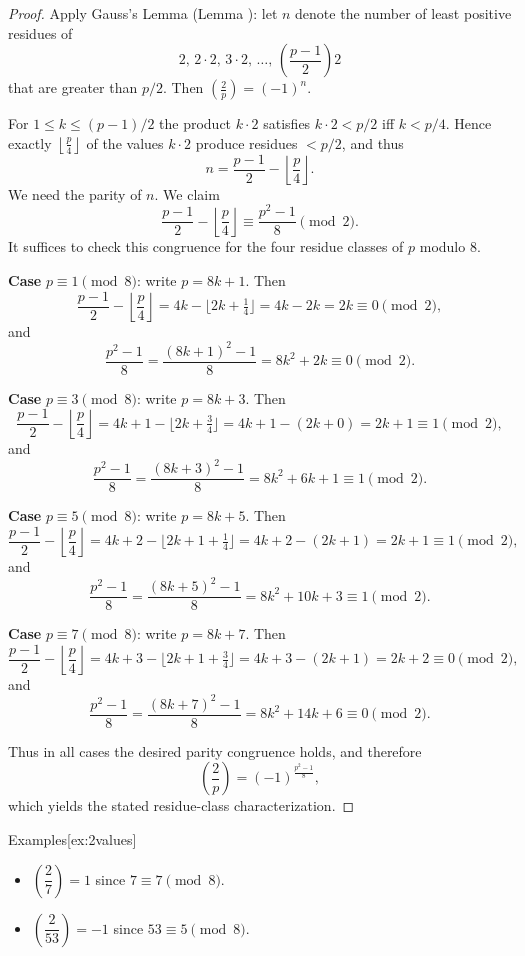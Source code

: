 \documentclass[10pt]{article}
\theoremstyle{definition}
\theoremstyle{plain}
\numberwithin{equation}{section}
\begin{document}
\begin{proof}
Apply Gauss's Lemma (Lemma ): let $n$ denote the number of least positive residues of
\[
2,\, 2\cdot 2,\, 3\cdot 2,\,\dots,\,\left(\frac{p-1}{2}\right)2
\]
that are greater than $p/2$. Then $\left(\frac{2}{p}\right)=(-1)^n$.

For $1\le k\le (p-1)/2$ the product $k\cdot 2$ satisfies $k\cdot2 < p/2$ iff $k<p/4$. Hence exactly
$\left\lfloor\frac{p}{4}\right\rfloor$ of the values $k\cdot 2$ produce residues $<p/2$, and thus
\[
n = \frac{p-1}{2} - \left\lfloor\frac{p}{4}\right\rfloor.
\]
We need the parity of $n$. We claim
\[
\frac{p-1}{2}-\left\lfloor\frac{p}{4}\right\rfloor \equiv \frac{p^2-1}{8}\pmod 2.
\]
It suffices to check this congruence for the four residue classes of $p$ modulo $8$.

\medskip\noindent
\textbf{Case }$p\equiv 1\pmod 8$: write $p=8k+1$. Then
\[
\frac{p-1}{2}-\left\lfloor\frac{p}{4}\right\rfloor = 4k - \lfloor 2k+\tfrac14\rfloor =4k-2k=2k\equiv 0\pmod2,
\]
and
\[
\frac{p^2-1}{8}=\frac{(8k+1)^2-1}{8}=8k^2+2k\equiv 0\pmod2.
\]

\medskip\noindent
\textbf{Case }$p\equiv 3\pmod 8$: write $p=8k+3$. Then
\[
\frac{p-1}{2}-\left\lfloor\frac{p}{4}\right\rfloor =4k+1 - \lfloor 2k+\tfrac34\rfloor =4k+1-(2k+0)=2k+1\equiv 1\pmod2,
\]
and
\[
\frac{p^2-1}{8}=\frac{(8k+3)^2-1}{8}=8k^2+6k+1\equiv 1\pmod2.
\]

\medskip\noindent
\textbf{Case }$p\equiv 5\pmod 8$: write $p=8k+5$. Then
\[
\frac{p-1}{2}-\left\lfloor\frac{p}{4}\right\rfloor =4k+2 - \lfloor 2k+1+\tfrac14\rfloor =4k+2-(2k+1)=2k+1\equiv 1\pmod2,
\]
and
\[
\frac{p^2-1}{8}=\frac{(8k+5)^2-1}{8}=8k^2+10k+3\equiv 1\pmod2.
\]

\medskip\noindent
\textbf{Case }$p\equiv 7\pmod 8$: write $p=8k+7$. Then
\[
\frac{p-1}{2}-\left\lfloor\frac{p}{4}\right\rfloor =4k+3 - \lfloor 2k+1+\tfrac34\rfloor =4k+3-(2k+1)=2k+2\equiv 0\pmod2,
\]
and
\[
\frac{p^2-1}{8}=\frac{(8k+7)^2-1}{8}=8k^2+14k+6\equiv 0\pmod2.
\]

Thus in all cases the desired parity congruence holds, and therefore
\[
\left(\frac{2}{p}\right)=(-1)^{\frac{p^2-1}{8}},
\]
which yields the stated residue-class characterization.
\end{proof}

\begin{define}{Examples}[ex:2values]
\begin{itemize}
  \item $\left(\dfrac{2}{7}\right)=1$ since $7\equiv 7\pmod 8$.
  \item $\left(\dfrac{2}{53}\right)=-1$ since $53\equiv 5\pmod 8$.
\end{itemize}
\end{define}
\end{document}
